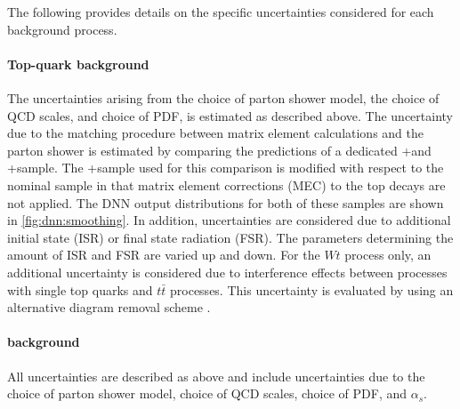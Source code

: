 \noindent The following provides details on the specific uncertainties considered for each background process. 
\paragraph{Top-quark background}
The uncertainties arising from the choice of parton shower model, the choice of QCD scales, and choice of PDF, is estimated as described above. 
The uncertainty due to the matching procedure between matrix element calculations and the parton shower is estimated by comparing the predictions of a dedicated \Powheg+\PYTHIA[8] and \aMCATNLO+\PYTHIA[8] sample. The \Powheg+\PYTHIA[8] sample used for this comparison is modified with respect to the nominal sample in that matrix element corrections (MEC) to the top decays are not applied. 
The DNN output distributions for both of these samples are shown in \cref{fig:dnn:smoothing}. 
In addition, uncertainties are considered due to additional initial state (ISR) or final state radiation (FSR). The parameters determining the amount of ISR and FSR are varied up and down.
For the $Wt$ process only, an additional uncertainty is considered due to interference effects between processes with single top quarks and $t\bar{t}$ processes. This uncertainty is evaluated by using an alternative diagram removal scheme \cite{Frixione:2008yi}. %

\paragraph{\Ztautau background}
All uncertainties are described as above and include uncertainties due to the choice of parton shower model, choice of QCD scales, choice of PDF, and $\alpha_s$.

